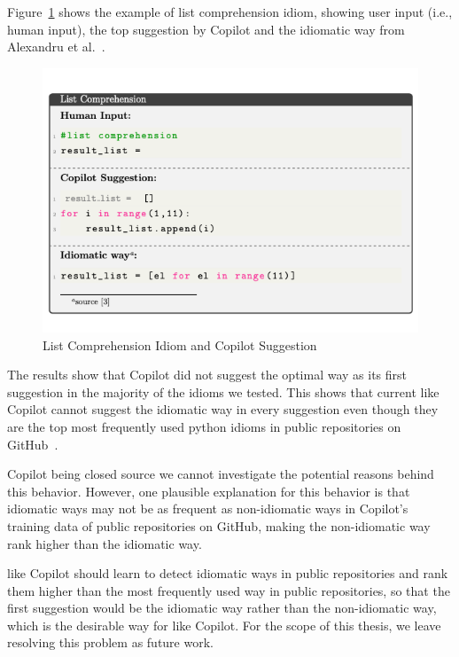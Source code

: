 Figure~\ref{fig:idioms_1} shows the example of list comprehension idiom, showing user input (i.e., human input), the top suggestion by Copilot and the idiomatic way from Alexandru et al.~\cite{Alexandru2018}.

\begin{figure}[hbt!]
    \centering
    \includegraphics[width=\linewidth]{Figures/idioms_1.png}
    \caption{List Comprehension Idiom and Copilot Suggestion}
    \label{fig:idioms_1}
\end{figure}

The results show that Copilot did not suggest the optimal way as its first suggestion in the majority of the idioms we tested. This shows that current \cct{} like Copilot cannot suggest the idiomatic way in every suggestion even though they are the top most frequently used python idioms in public repositories on GitHub~\cite{Alexandru2018}. 

Copilot being closed source we cannot investigate the potential reasons behind this behavior. However, one plausible explanation for this behavior is that idiomatic ways may not be as frequent as non-idiomatic ways in Copilot's training data of public repositories on GitHub, making the non-idiomatic way rank higher than the idiomatic way.

\cct{} like Copilot should learn to detect idiomatic ways in public repositories and rank them higher than the most frequently used way in public repositories, so that the first suggestion would be the idiomatic way rather than the non-idiomatic way, which is the desirable way for \cct{} like Copilot. For the scope of this thesis, we leave resolving this problem as future work.

